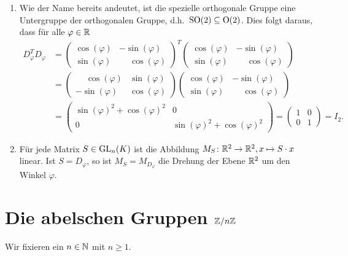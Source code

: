 \begin{bem}
 \begin{enumerate}[leftmargin=*]
  \item
   Wie der Name bereits andeutet, ist die spezielle orthogonale Gruppe eine Untergruppe der orthogonalen Gruppe, d.h.\ $\mathrm{SO}(2) \subseteq \mathrm{O}(2)$. Dies folgt daraus, dass für alle $\varphi \in \mathbb{R}$
   \begin{align*}
    D_\varphi^T D_\varphi
    &=
    \begin{pmatrix}
     \cos(\varphi) &           -\sin(\varphi) \\
     \sin(\varphi) & \phantom{-}\cos(\varphi)
    \end{pmatrix}^T
    \begin{pmatrix}
     \cos(\varphi) &           -\sin(\varphi) \\
     \sin(\varphi) & \phantom{-}\cos(\varphi)
    \end{pmatrix} \\
    &=
    \begin{pmatrix}
     \phantom{-}\cos(\varphi) & \sin(\varphi) \\
               -\sin(\varphi) & \cos(\varphi)
    \end{pmatrix}
    \begin{pmatrix}
     \cos(\varphi) & -\sin(\varphi) \\
     \sin(\varphi) & \phantom{-}\cos(\varphi)
    \end{pmatrix} \\
    &=
    \begin{pmatrix}
     \sin(\varphi)^2 + \cos(\varphi)^2 & 0 \\
     0 & \sin(\varphi)^2 + \cos(\varphi)^2
    \end{pmatrix}
    =
    \begin{pmatrix}
     1 & 0 \\
     0 & 1
    \end{pmatrix}
    = I_2.
   \end{align*}
  \item
   Für jede Matrix $S \in \mathrm{GL}_n(K)$ ist die Abbildung $M_S \colon \mathbb{R}^2 \to \mathbb{R}^2, x \mapsto S \cdot x$ linear. Ist $S = D_\varphi$, so ist $M_S = M_{D_\varphi}$ die Drehung der Ebene $\mathbb{R}^2$ um den Winkel $\varphi$.
 \end{enumerate}
\end{bem}





\section{Die abelschen Gruppen \texorpdfstring{$\mathbb{Z}/n\mathbb{Z}$}{Z/nZ}}\label{ss: ZnZ}
Wir fixieren ein $n \in \mathbb{N}$ mit $n \geq 1$.



